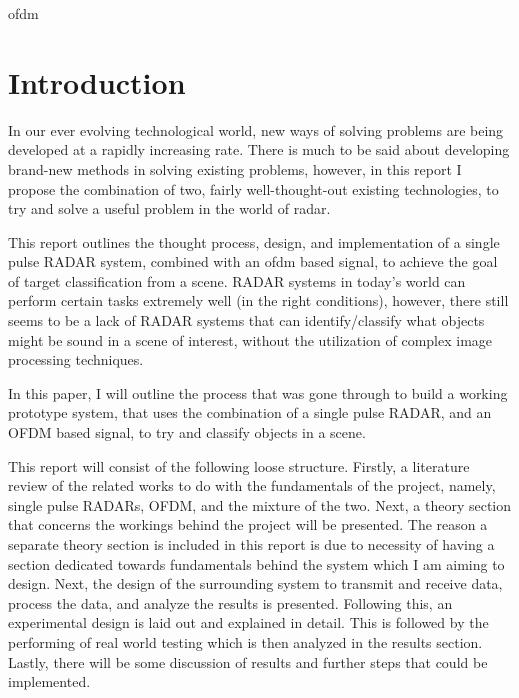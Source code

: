 \documentclass[11pt]{report}
\begin{document}




\glsresetall

\tableofcontents
\listoffigures
\listoftables

\gls{ofdm}
\printnoidxglossary[type=\acronymtype,nonumberlist,title={Acronyms}]
\newpage



\chapter{Introduction}\label{ch:Introduction}
In our ever evolving technological world, new ways of solving problems are being developed at a rapidly increasing rate. There is much to be said about developing brand-new methods in solving existing problems, however, in this report I propose the combination of two, fairly well-thought-out existing technologies, to try and solve a useful problem in the world of \gls{radar}. 

This report outlines the thought process, design, and implementation of a single pulse RADAR system, combined with an \gls{ofdm} based signal, to achieve the goal of target classification from a scene. RADAR systems in today's world can perform certain tasks extremely well (in the right conditions), however, there still seems to be a lack of RADAR systems that can identify/classify what objects might be sound in a scene of interest, without the utilization of complex image processing techniques. 

In this paper, I will outline the process that was gone through to build a working prototype system, that uses the combination of a single pulse RADAR, and an OFDM based signal, to try and classify objects in a scene.

This report will consist of the following loose structure. Firstly, a literature review of the related works to do with the fundamentals of the project, namely, single pulse RADARs, OFDM, and the mixture of the two. Next, a theory section that concerns the workings behind the project will be presented. The reason a separate theory section is included in this report is due to necessity of having a section dedicated towards fundamentals behind the system which I am aiming to design. Next, the design of the surrounding system to transmit and receive data, process the data, and analyze the results is presented. Following this, an experimental design is laid out and explained in detail. This is followed by the performing of real world testing which is then analyzed in the results section. Lastly, there will be some discussion of results and further steps that could be implemented.
\end{document}
